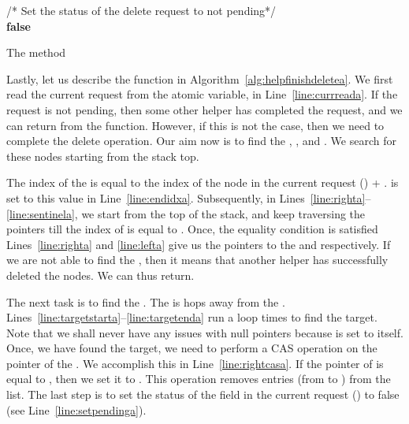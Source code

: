 \documentclass{llncs}
\begin{document}
\begin{appendix}
\begin{algorithm}
\vskip 2mm
		/* Set the status of the delete request to not pending*/ \\
		  \textbf{false} \label{line:setpendinga}

\caption{The  method} \label{alg:helpfinishdeletea}
\end{algorithm}
\normalsize
Lastly, let us describe the  function in Algorithm~\ref{alg:helpfinishdeletea}. 
We first read the current request from the atomic variable,  in Line~\ref{line:currreada}. If
the request is not pending, then some other helper has completed the request, and we can return from the function.
However, if this is not the case, then we need to complete the delete operation. Our aim now is to find the ,
, and . We search for these nodes starting from the stack top.

The index of the  is equal to the index of the node in the current request () + . 
 is set to this value in Line~\ref{line:endidxa}.
Subsequently, in Lines~\ref{line:righta}--\ref{line:sentinela}, we start from the top of the stack, and keep traversing the 
pointers till the index of  is equal to . Once, the equality condition is satisfied
Lines~\ref{line:righta} and \ref{line:lefta} give us the pointers to the  and  respectively. If
we are not able to find the , then it means that another helper has successfully deleted the nodes. We can
thus return. 

The next task is to find the . The  is  hops away from the .
Lines~\ref{line:targetstarta}--\ref{line:targetenda} run a loop  times to find the target. Note that we shall never
have any issues with null pointers because  is set to  itself. Once, we have found the
target, we need to perform a CAS operation on the  pointer of the . We accomplish this in
Line~\ref{line:rightcasa}. If the  pointer of  is equal to , then we set it to .
This operation removes  entries (from  to ) from the list. The last step is to set the 
status of the  field in the current request () to false (see Line~\ref{line:setpendinga}).


\end{appendix}
\end{document}
